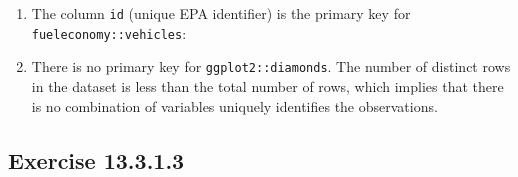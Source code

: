 \documentclass[]{book}
\newenvironment{Shaded}{\begin{snugshade}}{\end{snugshade}}
\newcommand{\CommentTok}[1]{\textcolor[rgb]{0.56,0.35,0.01}{\textit{#1}}}
\newcommand{\DecValTok}[1]{\textcolor[rgb]{0.00,0.00,0.81}{#1}}
\newcommand{\KeywordTok}[1]{\textcolor[rgb]{0.13,0.29,0.53}{\textbf{#1}}}
\newcommand{\NormalTok}[1]{#1}
\newcommand{\OperatorTok}[1]{\textcolor[rgb]{0.81,0.36,0.00}{\textbf{#1}}}
\newcommand{\StringTok}[1]{\textcolor[rgb]{0.31,0.60,0.02}{#1}}
\theoremstyle{plain}
\theoremstyle{remark}
\begin{document}
\begin{enumerate}
\begin{Shaded}
\end{Shaded}
\item
  The column \texttt{id} (unique EPA identifier) is the primary key for
  \texttt{fueleconomy::vehicles}:

\begin{Shaded}
\end{Shaded}
\item
  There is no primary key for \texttt{ggplot2::diamonds}. The number of
  distinct rows in the dataset is less than the total number of rows,
  which implies that there is no combination of variables uniquely
  identifies the observations.

\begin{Shaded}
\end{Shaded}
\end{enumerate}

\hypertarget{exercise-13.3.1.3}{%
\subsection*{\texorpdfstring{Exercise
{13.3.1.3}}{Exercise 13.3.1.3}}\label{exercise-13.3.1.3}}
\end{document}
